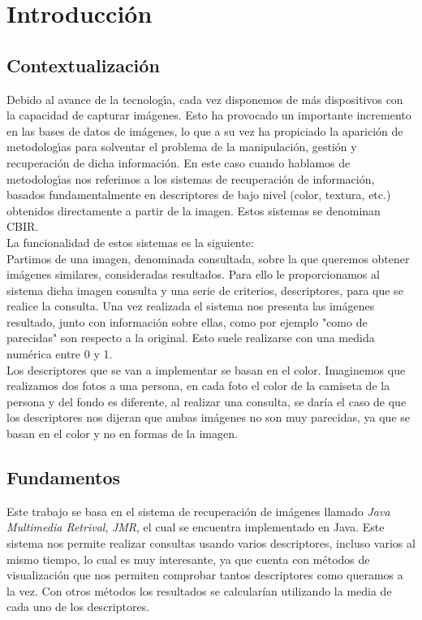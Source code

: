 \chapter{Introducción}
\label{cap:introduccion}

\section{Contextualización}

Debido al avance de la tecnologı́a, cada vez disponemos de más dispositivos con la capacidad de capturar imágenes. Esto ha provocado un importante incremento en las bases de datos de imágenes, lo que a su vez ha propiciado la aparición de metodologı́as para solventar el problema de la manipulación, gestión y recuperación de dicha información. En este caso cuando hablamos de metodologı́as nos referimos a los sistemas de recuperación de información, basados fundamentalmente en descriptores de bajo nivel (color, textura, etc.) obtenidos directamente a partir de la imagen. Estos sistemas se denominan CBIR.\\

La funcionalidad de estos sistemas es la siguiente:\\

Partimos de una imagen, denominada consultada, sobre la que queremos obtener imágenes similares, consideradas resultados. Para ello le proporcionamos al sistema dicha imagen consulta y una serie de criterios, descriptores, para que se realice la consulta. Una vez realizada el sistema nos presenta las imágenes resultado, junto con información sobre ellas, como por ejemplo "como de parecidas" son respecto a la original. Esto suele realizarse con una medida numérica entre 0 y 1.\\

Los descriptores que se van a implementar se basan en el color. Imaginemos que realizamos dos fotos a una persona, en cada foto el color de la camiseta de la persona y del fondo es diferente, al realizar una consulta, se daría el caso de que los descriptores nos dijeran que ambas imágenes no son muy parecidas, ya que se basan en el color y no en formas de la imagen. 

\section{Fundamentos}

Este trabajo se basa en el sistema de recuperación de imágenes llamado \textit{Java Multimedia Retrival}, \textit{JMR}, el cual se encuentra implementado en Java. Este sistema nos permite realizar consultas usando varios descriptores, incluso varios al mismo tiempo, lo cual es muy interesante, ya que cuenta con métodos de visualización que nos permiten comprobar tantos descriptores como queramos a la vez. Con otros métodos los resultados se calcularían utilizando la media de cada uno de los descriptores.\\

